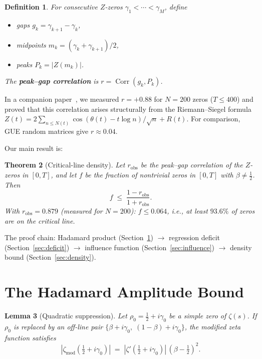 \documentclass[11pt,a4paper]{article}
\newtheorem{theorem}{Theorem}
\newtheorem{lemma}[theorem]{Lemma}
\newtheorem{definition}[theorem]{Definition}
\DeclareMathOperator{\Corr}{Corr}
\begin{document}
\begin{definition}\label{def:peakgap}
For consecutive $Z$-zeros $\gamma_1 < \cdots < \gamma_M$, define
\begin{itemize}[nosep]
\item gaps $g_k = \gamma_{k+1} - \gamma_k$,
\item midpoints $m_k = (\gamma_k+\gamma_{k+1})/2$,
\item peaks $P_k = |Z(m_k)|$.
\end{itemize}
The \textbf{peak--gap correlation} is $r = \Corr(g_k, P_k)$.
\end{definition}

In a companion paper~\cite{EigRigidity}, we measured $r = +0.88$ for $N = 200$ zeros ($T \leq 400$) and proved that this correlation arises structurally from the Riemann--Siegel formula $Z(t) = 2\sum_{n \leq N(t)} \cos(\theta(t)-t\log n)/\sqrt{n} + R(t)$.
For comparison, GUE random matrices give $r \approx 0.04$.

Our main result is:

\begin{theorem}[Critical-line density]\label{thm:density}
Let $r_{\mathrm{obs}}$ be the peak--gap correlation of the $Z$-zeros in $[0, T]$, and let $f$ be the fraction of nontrivial zeros in $[0, T]$ with $\beta \neq \frac{1}{2}$.
Then
\[
f \;\leq\; \frac{1 - r_{\mathrm{obs}}}{1 + r_{\mathrm{obs}}}.
\]
With $r_{\mathrm{obs}} = 0.879$ (measured for $N = 200$): $f \leq 0.064$, i.e., at least $93.6\%$ of zeros are on the critical line.
\end{theorem}

The proof chain: Hadamard product (Section~\ref{sec:hadamard}) $\to$ regression deficit (Section~\ref{sec:deficit}) $\to$ influence function (Section~\ref{sec:influence}) $\to$ density bound (Section~\ref{sec:density}).


\section{The Hadamard Amplitude Bound}\label{sec:hadamard}

\begin{lemma}[Quadratic suppression]\label{lem:hadamard}
Let $\rho_0 = \frac{1}{2}+i\gamma_0$ be a simple zero of $\zeta(s)$.
If $\rho_0$ is replaced by an off-line pair $\{\beta+i\gamma_0,\; (1{-}\beta)+i\gamma_0\}$, the modified zeta function satisfies
\[
|\zeta_{\mathrm{mod}}(\tfrac{1}{2}+i\gamma_0)| \;=\; |\zeta'(\tfrac{1}{2}+i\gamma_0)|\,(\beta - \tfrac{1}{2})^2.
\]
\end{lemma}
\end{document}
